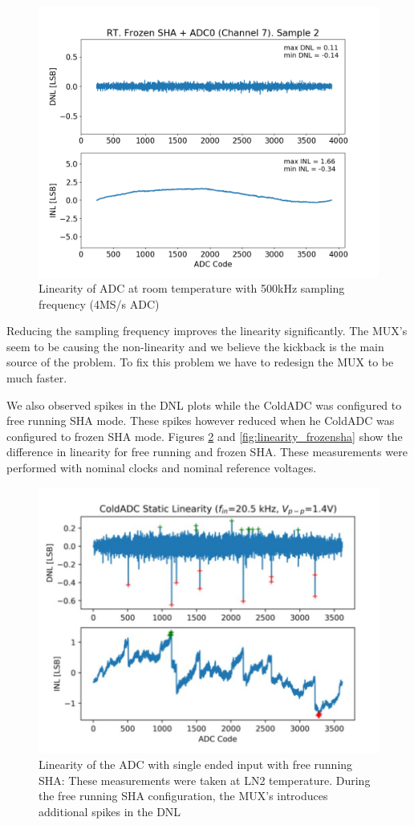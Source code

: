 \begin{figure}[h!]
\centering
  \includegraphics[width=0.7\linewidth]{figures/prakash_fig/linearity_mux_500K.png}
  \caption{Linearity of ADC at room temperature with 500kHz sampling frequency (4MS/s ADC)}
  \label{fig:linearity_mux_500K}
\end{figure}

Reducing the sampling frequency improves the linearity significantly. The MUX's seem to be causing the non-linearity and we believe the kickback is the main source of the problem. To fix this problem we have to redesign the MUX to be much faster. 

We also observed spikes in the DNL plots while the ColdADC was configured to free running SHA mode. These spikes however reduced when he ColdADC was configured to frozen SHA mode. Figures \ref{fig:linearity_freesha} and \ref{fig:linearity_frozensha} show the difference in linearity for free running and frozen SHA. These measurements were performed with nominal clocks and nominal reference voltages.  

\begin{figure}[h!]
\centering
  \includegraphics[width=0.7\linewidth]{figures/prakash_fig/linearity_freesha.JPG}
  \caption[Linearity of the ADC with single ended input with free running SHA]{Linearity of the ADC with single ended input with free running SHA: These measurements were taken at LN2 temperature. During the free running SHA configuration, the MUX's introduces additional spikes in the DNL}
  \label{fig:linearity_freesha}
\end{figure}

